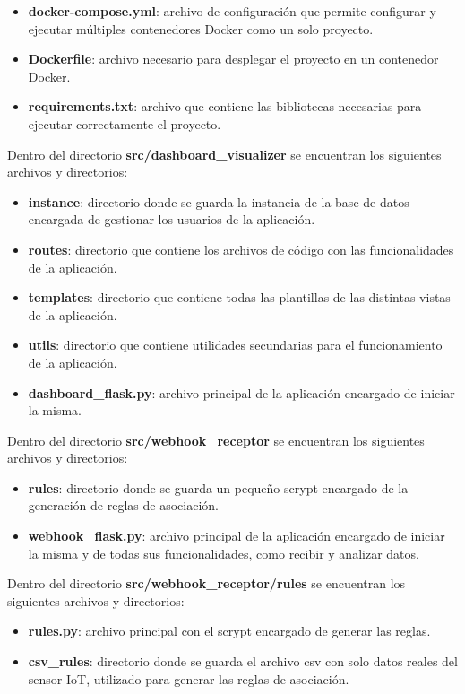 \begin{itemize}
    \item \textbf{docker-compose.yml}: archivo de configuración que permite configurar y ejecutar múltiples contenedores Docker como un solo proyecto.
    \item \textbf{Dockerfile}: archivo necesario para desplegar el proyecto en un contenedor Docker.
    \item \textbf{requirements.txt}: archivo que contiene las bibliotecas necesarias para ejecutar correctamente el proyecto.
\end{itemize}

Dentro del directorio \textbf{src/dashboard\_visualizer} se encuentran los siguientes archivos y directorios:

\begin{itemize}
    \item \textbf{instance}: directorio donde se guarda la instancia de la base de datos encargada de gestionar los usuarios de la aplicación.
    \item \textbf{routes}: directorio que contiene los archivos de código con las funcionalidades de la aplicación.
    \item \textbf{templates}: directorio que contiene todas las plantillas de las distintas vistas de la aplicación.
    \item \textbf{utils}: directorio que contiene utilidades secundarias para el funcionamiento de la aplicación.
    \item \textbf{dashboard\_flask.py}: archivo principal de la aplicación encargado de iniciar la misma.
\end{itemize}

Dentro del directorio \textbf{src/webhook\_receptor} se encuentran los siguientes archivos y directorios:

\begin{itemize}
    \item \textbf{rules}: directorio donde se guarda un pequeño scrypt encargado de la generación de reglas de asociación.
    \item \textbf{webhook\_flask.py}: archivo principal de la aplicación encargado de iniciar la misma y de todas sus funcionalidades, como recibir y analizar datos.
\end{itemize}

Dentro del directorio \textbf{src/webhook\_receptor/rules} se encuentran los siguientes archivos y directorios:
\begin{itemize}
    \item \textbf{rules.py}: archivo principal con el scrypt encargado de generar las reglas.
    \item \textbf{csv\_rules}: directorio donde se guarda el archivo csv con solo datos reales del sensor IoT, utilizado para generar las reglas de asociación.
\end{itemize}



